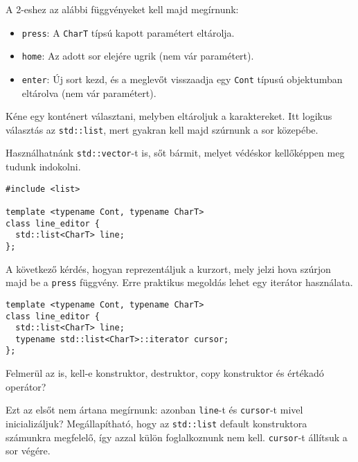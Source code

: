 \documentclass[../cpp_book/cpp_book.tex]{subfiles}
\begin{document}
	A 2-eshez az alábbi függvényeket kell majd megírnunk:
	\begin{itemize}
		\item \texttt{press}: A \texttt{CharT} típsú kapott paramétert eltárolja.
		\item \texttt{home}: Az adott sor elejére ugrik (nem vár paramétert).
		\item \texttt{enter}: Új sort kezd, és a meglevőt visszaadja egy \texttt{Cont} típusú objektumban eltárolva (nem vár paramétert).
	\end{itemize}
	Kéne egy konténert választani, melyben eltároljuk a karaktereket. Itt logikus választás az \texttt{std::list}, mert gyakran kell majd szúrnunk a sor közepébe.
	\begin{note}
		Használhatnánk \texttt{std::vector}-t is, sőt bármit, melyet védéskor kellőképpen meg tudunk indokolni.
	\end{note}
\begin{lstlisting}
#include <list>

template <typename Cont, typename CharT>
class line_editor {
  std::list<CharT> line;
};
\end{lstlisting}
	A következő kérdés, hogyan reprezentáljuk a kurzort, mely jelzi hova szúrjon majd be a \texttt{press} függvény. Erre praktikus megoldás lehet egy iterátor használata.

\begin{lstlisting}
template <typename Cont, typename CharT>
class line_editor {
  std::list<CharT> line;
  typename std::list<CharT>::iterator cursor;
};
\end{lstlisting}
	Felmerül az is, kell-e konstruktor, destruktor, copy konstruktor és értékadó operátor? 
	
	Ezt az elsőt nem ártana megírnunk: azonban \texttt{line}-t és \texttt{cursor}-t mivel inicializáljuk? Megállapítható, hogy az \texttt{std::list} default konstruktora számunkra megfelelő, így azzal külön foglalkoznunk nem kell. \texttt{cursor}-t állítsuk a sor végére.
	
\end{document}
